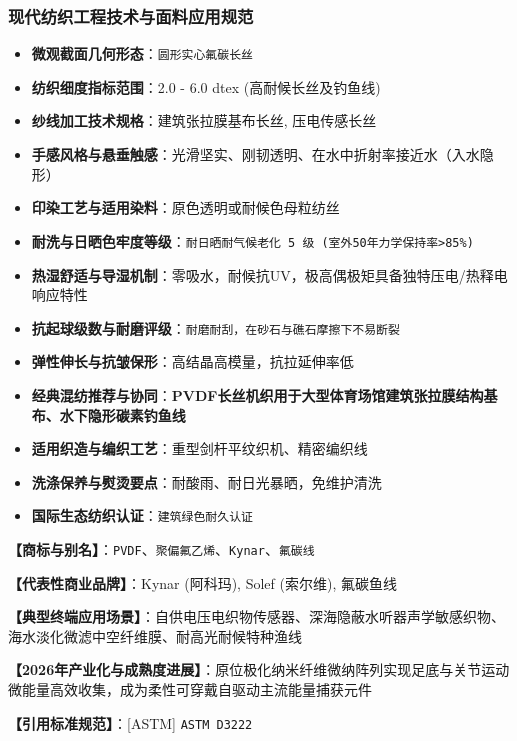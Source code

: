 \documentclass[11pt,openright,twoside,UTF8]{ctexbook}
\begin{document}
\subsubsection*{现代纺织工程技术与面料应用规范}
\begin{itemize} \setlength{\itemsep}{2pt}
    \item \textbf{微观截面几何形态}：\texttt{圆形实心氟碳长丝}
    \item \textbf{纺织细度指标范围}：2.0 - 6.0 dtex (高耐候长丝及钓鱼线)
    \item \textbf{纱线加工技术规格}：建筑张拉膜基布长丝, 压电传感长丝
    \item \textbf{手感风格与悬垂触感}：光滑坚实、刚韧透明、在水中折射率接近水（入水隐形）
    \item \textbf{印染工艺与适用染料}：原色透明或耐候色母粒纺丝
    \item \textbf{耐洗与日晒色牢度等级}：\texttt{耐日晒耐气候老化 5 级 (室外50年力学保持率\textgreater{}85\%)}
    \item \textbf{热湿舒适与导湿机制}：零吸水，耐候抗UV，极高偶极矩具备独特压电/热释电响应特性
    \item \textbf{抗起球级数与耐磨评级}：\texttt{耐磨耐刮，在砂石与礁石摩擦下不易断裂}
    \item \textbf{弹性伸长与抗皱保形}：高结晶高模量，抗拉延伸率低
    \item \textbf{经典混纺推荐与协同}：\textbf{PVDF长丝机织用于大型体育场馆建筑张拉膜结构基布、水下隐形碳素钓鱼线}
    \item \textbf{适用织造与编织工艺}：重型剑杆平纹织机、精密编织线
    \item \textbf{洗涤保养与熨烫要点}：耐酸雨、耐日光暴晒，免维护清洗
    \item \textbf{国际生态纺织认证}：\texttt{建筑绿色耐久认证}
\end{itemize}
\vspace{0.2cm}

\noindent\textbf{【商标与别名】}：\texttt{PVDF}、\texttt{聚偏氟乙烯}、\texttt{Kynar}、\texttt{氟碳线}\par
\noindent\textbf{【代表性商业品牌】}：Kynar (阿科玛), Solef (索尔维), 氟碳鱼线\par
\noindent\textbf{【典型终端应用场景】}：自供电压电织物传感器、深海隐蔽水听器声学敏感织物、海水淡化微滤中空纤维膜、耐高光耐候特种渔线\par
\noindent\textbf{【2026年产业化与成熟度进展】}：原位极化纳米纤维微纳阵列实现足底与关节运动微能量高效收集，成为柔性可穿戴自驱动主流能量捕获元件\par
\noindent\textbf{【引用标准规范】}：[ASTM] \texttt{ASTM D3222}\par
\vspace{0.5cm}
\end{document}
